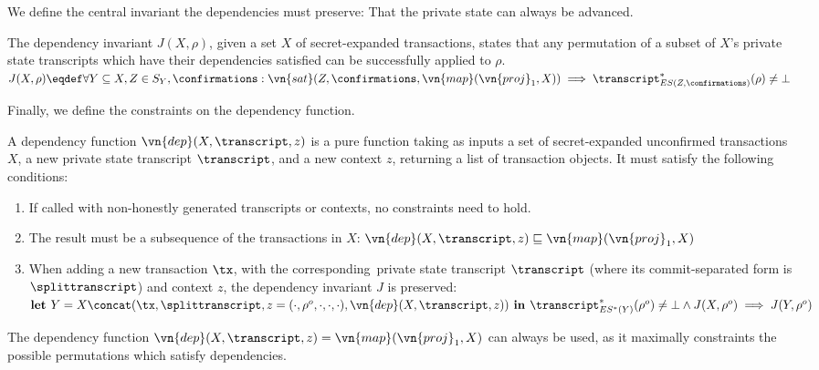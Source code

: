 \noindent We define the central invariant the dependencies must preserve:
That the private state can always be advanced.

\begin{definition}
  \sloppy
  \label{def:invdep}
  The dependency invariant $J(X, \rho)$, given a set $X$ of secret-expanded
  transactions, states that any permutation of a subset of $X$'s private state
  transcripts which have their dependencies satisfied can be successfully applied to $\rho$.
  $J(X, \rho) \eqdef \forall Y \subseteq X, Z \in S_Y, \confirmations : \vn{sat}(Z,\allowbreak
  \confirmations, \vn{map}(\vn{proj}_1, X)) \implies
  \transcript^*_{ES(Z, \confirmations)}(\rho) \neq \bot$
\end{definition}

\fussy
\noindent Finally, we define the constraints on the dependency function.

\begin{definition}
  \label{def:dep}
  A dependency function $\vn{dep}(X, \transcript, z)$ is a pure function taking
  as inputs a set of secret-expanded unconfirmed transactions $X$, a new
  private state transcript $\transcript$, and a new context $z$, returning a
  list of transaction objects. It must satisfy the following conditions:
  \begin{enumerate}
    \item If called with non-honestly generated transcripts or contexts, no
      constraints need to hold.
    \item The result must be a subsequence of the transactions in $X$:
      $\vn{dep}(X, \transcript, z) \sqsubseteq \vn{map}(\vn{proj}_1, X)$
    \item When adding a new transaction $\tx$, with the corresponding\
      private state transcript $\transcript$ (where its
        commit-separated form is $\splittranscript$) and context $z$, the
      dependency invariant $J$ is preserved: $\textbf{let }\allowbreak Y =
      X\allowbreak \concat (\tx, \splittranscript,\allowbreak
      z\allowbreak =\allowbreak (\cdot, \rho^o, \cdot, \cdot, \cdot),
      \vn{dep}(X,\allowbreak \transcript,\allowbreak z)) \allowbreak\textbf{ in
      }\allowbreak \transcript^*_{ES^*(Y)}(\rho^o)\allowbreak \neq \bot \land J(X, \rho^o)\allowbreak \implies
      J(Y,\allowbreak \rho^o)$
  \end{enumerate}
\end{definition}

The dependency function $\vn{dep}(X, \transcript, z) = \vn{map}(\vn{proj}_1, X)$
can always be used, as it maximally constraints the possible permutations which
satisfy dependencies.

